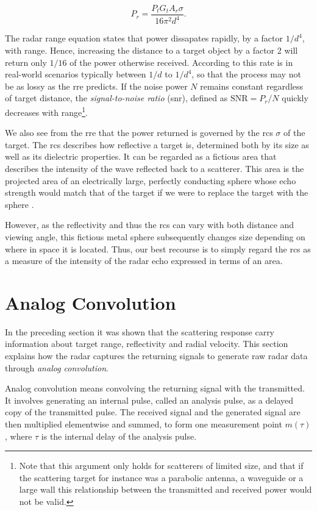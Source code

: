 \begin{equation}
	P_r
	= \frac{P_t G_t A_r \sigma}{16\pi^2 d^4}.
\end{equation}

The radar range equation states that power dissapates rapidly, by a factor $1/d^4$, with range. Hence, increasing the distance to a target object by a factor 2 will return only $1/16$ of the power otherwise received. According to \citep{richards_2014} this rate is in real-world scenarios typically between $1/d$ to $1/d^4$, so that the process may not be as lossy as the \gls{rre} predicts. If the noise power $N$ remains constant regardless of target distance, the \emph{signal-to-noise ratio} (\gls{snr}), defined as $\text{SNR} = P_r/N$ quickly decreases with range\footnote{Note that this argument only holds for scatterers of limited size, and that if the scattering target for instance was a parabolic antenna, a waveguide or a large wall this relationship between the transmitted and received power would not be valid.}. 

We also see from the \gls{rre} that the power returned is governed by the \gls{rcs} $\sigma$ of the target. The \gls{rcs} describes how reflective a target is, determined both by its size as well as its dielectric properties. It can be regarded as a fictious area that describes the intensity of the wave reflected back to a scatterer. This area is the projected area of an electrically large, perfectly conducting sphere whose echo strength would match that of the target if we were to replace the target with the sphere \citep{knott_1993}. 

However, as the reflectivity and thus the \gls{rcs} can vary with both distance and viewing angle, this fictious metal sphere subsequently changes size depending on where in space it is located. Thus, our best recourse is to simply regard the \gls{rcs} as a measure of the intensity of the radar echo expressed in terms of an area. 

\section{Analog Convolution}

In the preceding section it was shown that the scattering response carry information about target range, reflectivity and radial velocity. This section explains how the radar captures the returning signals to generate raw radar data through \emph{analog convolution}.

Analog convolution means convolving the returning signal with the transmitted. It involves generating an internal pulse, called an analysis pulse, as a delayed copy of the transmitted pulse. The received signal and the generated signal are then multiplied elementwise and summed, to form one measurement point $m(\tau)$, where $\tau$ is the internal delay of the analysis pulse. 

